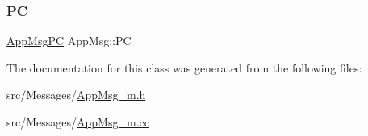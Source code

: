 \subsubsection{\texorpdfstring{PC}{PC}}
{\footnotesize\ttfamily \hyperlink{_app_msg__m_8h_abcd76636e4b750d033ffc348601dd7a2}{App\+Msg\+PC} App\+Msg\+::\+PC\hspace{0.3cm}{\ttfamily [protected]}}



The documentation for this class was generated from the following files\+:\begin{DoxyCompactItemize}
\item 
src/\+Messages/\hyperlink{_app_msg__m_8h}{App\+Msg\+\_\+m.\+h}\item 
src/\+Messages/\hyperlink{_app_msg__m_8cc}{App\+Msg\+\_\+m.\+cc}\end{DoxyCompactItemize}
